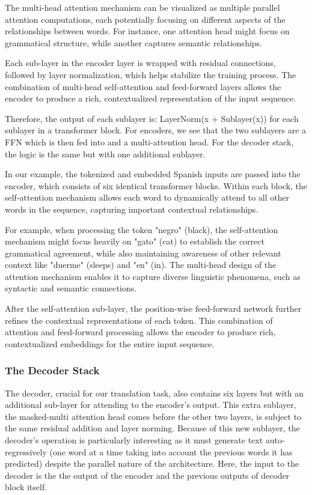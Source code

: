The multi-head attention mechanism can be visualized as multiple parallel attention computations, each potentially focusing on different aspects of the relationships between words. For instance, one attention head might focus on grammatical structure, while another captures semantic relationships.

Each sub-layer in the encoder layer is wrapped with residual connections, followed by layer normalization, which helps stabilize the training process. The combination of multi-head self-attention and feed-forward layers allows the encoder to produce a rich, contextualized representation of the input sequence. 

Therefore, the output of each sublayer is:
	LayerNorm(x + Sublayer(x)) for each sublayer in a transformer block. 
For encoders, we see that the two sublayers are a FFN which is then fed into and a multi-attention head. For the decoder stack, the logic is the same but with one additional sublayer. 

In our example, the tokenized and embedded Spanish inputs are passed into the encoder, which consists of six identical transformer blocks. Within each block, the self-attention mechanism allows each word to dynamically attend to all other words in the sequence, capturing important contextual relationships.

For example, when processing the token "negro" (black), the self-attention mechanism might focus heavily on "gato" (cat) to establish the correct grammatical agreement, while also maintaining awareness of other relevant context like "duerme" (sleeps) and "en" (in). The multi-head design of the attention mechanism enables it to capture diverse linguistic phenomena, such as syntactic and semantic connections.

After the self-attention sub-layer, the position-wise feed-forward network further refines the contextual representations of each token. This combination of attention and feed-forward processing allows the encoder to produce rich, contextualized embeddings for the entire input sequence.

\subsubsection{The Decoder Stack}
The decoder, crucial for our translation task, also contains six layers but with an additional sub-layer for attending to the encoder's output. This extra sublayer, the masked-multi attention head comes before the other two layers, is subject to the same residual addition and layer norming. Because of this new sublayer, the decoder's operation is particularly interesting as it must generate text auto-regressively (one word at a time taking into account the previous words it has predicted) despite the parallel nature of the architecture. Here, the input to the decoder is the the output of the encoder and the previous outputs of decoder block itself. 

